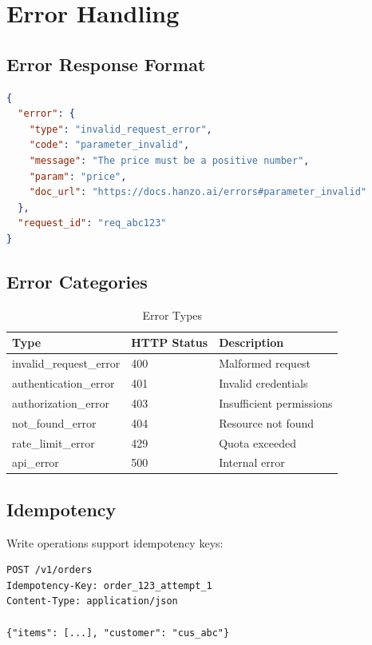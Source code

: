 \section{Error Handling}


\subsection{Error Response Format}

\begin{lstlisting}[language=json, caption=Error Response]
{
  "error": {
    "type": "invalid_request_error",
    "code": "parameter_invalid",
    "message": "The price must be a positive number",
    "param": "price",
    "doc_url": "https://docs.hanzo.ai/errors#parameter_invalid"
  },
  "request_id": "req_abc123"
}
\end{lstlisting}

\subsection{Error Categories}

\begin{table}[h]
\centering
\caption{Error Types}
\begin{tabular}{lll}
\toprule
\textbf{Type} & \textbf{HTTP Status} & \textbf{Description} \\
\midrule
invalid\_request\_error & 400 & Malformed request \\
authentication\_error & 401 & Invalid credentials \\
authorization\_error & 403 & Insufficient permissions \\
not\_found\_error & 404 & Resource not found \\
rate\_limit\_error & 429 & Quota exceeded \\
api\_error & 500 & Internal error \\
\bottomrule
\end{tabular}
\end{table}

\subsection{Idempotency}

Write operations support idempotency keys:

\begin{lstlisting}[caption=Idempotent Request]
POST /v1/orders
Idempotency-Key: order_123_attempt_1
Content-Type: application/json

{"items": [...], "customer": "cus_abc"}
\end{lstlisting}

